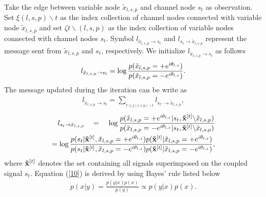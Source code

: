 \documentclass[conference]{IEEEtran}
\begin{document}
Take the edge between variable node ${\tilde {x}_{l,s,p}}$ and channel node ${s_t}$ as observation. Set $\xi (l,s,p)\backslash t$ as the index collection of channel nodes connected with variable node ${\tilde {x}_{l,s,p}}$ and set $\zeta t\backslash (l,s,p)$ as the index collection of variable nodes connected with channel nodes ${s_t}$. Symbol ${l_{{{\tilde {x}}_{l,s,p}} \to {s_t}}}$ and ${l_{{s_t} \to {{\tilde {x}}_{l,s,p}}}}$ represent the message sent from ${\tilde {x}_{l,s,p}}$ and ${s_t}$, respectively. We initialize ${l_{{{\tilde {x}}_{l,s,p}} \to {s_t}}}$ as follows
\begin{equation}
{l_{{{\tilde x}_{l,s,p}} \to {s_t}}} = \log {\rm{ }}\frac{{p({{\tilde x}_{l,s,p}} =  + {e^{i{\theta _{l,s}}}})}}{{p({{\tilde x}_{l,s,p}} =  - {e^{i{\theta _{l,s}}}})}}\label{8}.
\end{equation}
The message updated during the iteration can be write as
\begin{equation}
\begin{aligned}
{l_{{{\tilde {x}}_{l,s,p}} \to {s_t}}} = \sum\limits_{_{t' \in \xi (l,s,p)\backslash t}} {{l_{{s_{t'}} \to {{\tilde {x}}_{l,s,p}}}}}\label{9},
\end{aligned}
\end{equation}
\begin{equation}
\begin{aligned}
{l_{{s_t} \to {{\tilde {x}}_{l,s,p}}}}\;\;\;{\kern 1pt}  = \;\;\;{\kern 1pt} \log \frac{{p({{\tilde {x}}_{l,s,p}} =  + {e^{i{\theta _{l,s}}}}|{s_t},{{\bf{\tilde x}}^{[t]}}\backslash {{\tilde {x}}_{l,s,p}})}}{{p({{\tilde {x}}_{l,s,p}} =  - {e^{i{\theta _{l,s}}}}|{s_t},{{\bf{\tilde x}}^{[t]}}\backslash {{\tilde {x}}_{l,s,p}})}} \\
= \log \frac{{p({s_t}|{{\bf{\tilde x}}^{[t]}},{{\tilde {x}}_{l,s,p}} =  + {e^{i{\theta _{l,s}}}})p({{\bf{\tilde x}}^{[t]}}|{{\tilde {x}}_{l,s,p}} =  + {e^{i{\theta _{l,s}}}})}}{{p({s_t}|{{\bf{\tilde x}}^{[t]}},{{\tilde {x}}_{l,s,p}} =  - {e^{i{\theta _{l,s}}}})p({{\bf{\tilde x}}^{[t]}}|{{\tilde {x}}_{l,s,p}} =  - {e^{i{\theta _{l,s}}}})}}\label{10},
\end{aligned}
\end{equation}
where ${{\bf{\tilde {\bf{x}}}}^{[t]}}$ denotes the set containing all signals superimposed on the coupled signal ${{s_t}}$. Equation (\ref{10}) is derived by using Bayes' rule listed below
\begin{equation}
\begin{aligned}
p(x|y) = \frac{{p(y|x)p(x)}}{{p(y)}}\propto p(y|x)p(x)\label{11}.
\end{aligned}
\end{equation}
\end{document}
